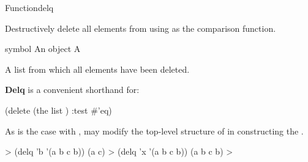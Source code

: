 \documentclass[10pt,twoside,english,pdftex]{article}
\begin{document}

\begin{functiondoc}{Function}{delq}{
    \returns{} } 
%
  
\fnsyntax

\fnpurpose Destructively delete all  elements from 
using  as the comparison function.

\fnpackage {}

\fnmodule {}

\fnargs
\begin{args}{symbol}
\arg[item] An object
\arg[list] A 
\end{args}

\fnreturns A list from which all  elements have been deleted.

\fndescription \textbf{Delq} is a convenient shorthand for:
%
\W\supp
\begin{example}
  (delete  (the list ) :test #'eq)
\end{example}
%
As is the case with ,  may modify the
top-level structure of  in constructing the
.

\fnexamples
\W\supp
\begin{example}
  > (delq 'b '(a b c b))
  (a c)
  > (delq 'x '(a b c b))
  (a b c b)
  >
\end{example}

\end{functiondoc}

\end{document}

